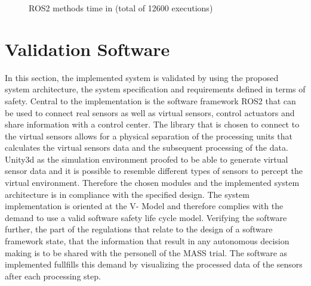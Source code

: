 		\begin{figure}
		\begin{center}
			\caption{ROS2 methods time in (total of 12600 executions)}
			\label{fig_transmission}%
		\end{center}
	\end{figure}
	
	\section{Validation Software} \label{validate}
	In this section, the implemented system is validated by using the proposed system architecture, the system specification and requirements defined in terms of safety. Central to the implementation is the software framework \ac{ROS2} that can be used to connect real sensors as well as virtual sensors, control actuators and share information with a control center. The library that is chosen to connect to the virtual sensors allows for a physical separation of the processing units that calculates the virtual sensors data and the subsequent processing of the data. Unity3d as the simulation environment proofed to be able to generate virtual sensor data and it is possible to resemble different types of sensors to percept the virtual environment. Therefore the chosen modules and the implemented system architecture is in compliance with the specified design. The system implementation is oriented at the V- Model and therefore complies with the demand to use a valid software safety life cycle model. Verifying the software further, the part of the regulations that relate to the design of a software framework state, that the information that result in any autonomous decision making is to be shared with the personell of the \ac{MASS} trial. The software as implemented fullfills this demand by visualizing the processed data of the sensors after each processing step.\\
	
